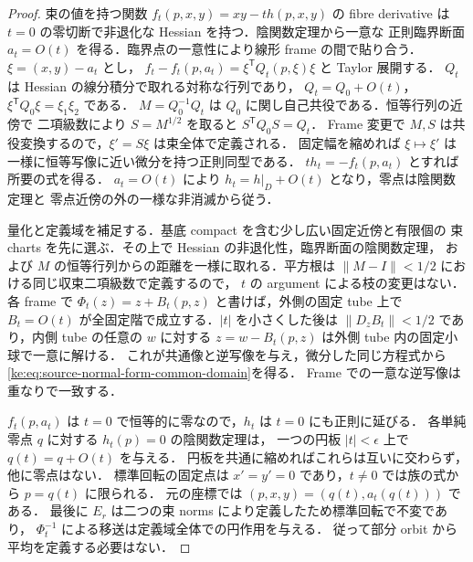 \begin{proof}
束の値を持つ関数 $f_t(p,x,y)=xy-th(p,x,y)$ の fibre derivative は
$t=0$ の零切断で非退化な Hessian を持つ．陰関数定理から一意な
正則臨界断面 $a_t=O(t)$ を得る．臨界点の一意性により線形 frame の間で貼り合う．
$\xi=(x,y)-a_t$ とし，
$f_t-f_t(p,a_t)=\xi^{\mathsf T} Q_t(p,\xi)\xi$ と Taylor 展開する．
$Q_t$ は Hessian の線分積分で取れる対称な行列であり，
$Q_t=Q_0+O(t)$，$\xi^{\mathsf T}Q_0\xi=\xi_1\xi_2$ である．
$M=Q_0^{-1}Q_t$ は $Q_0$ に関し自己共役である．恒等行列の近傍で
二項級数により $S=M^{1/2}$ を取ると $S^{\mathsf T}Q_0 S=Q_t$．
Frame 変更で $M,S$ は共役変換するので，$\xi'=S\xi$ は束全体で定義される．
固定幅を縮めれば $\xi\mapsto\xi'$ は一様に恒等写像に近い微分を持つ正則同型である．
$t h_t=-f_t(p,a_t)$ とすれば所要の式を得る．
$a_t=O(t)$ により $h_t=h|_D+O(t)$ となり，零点は陰関数定理と
零点近傍の外の一様な非消滅から従う．

量化と定義域を補足する．基底 compact を含む少し広い固定近傍と有限個の
束 charts を先に選ぶ．その上で Hessian の非退化性，臨界断面の陰関数定理，
および $M$ の恒等行列からの距離を一様に取れる．平方根は
$\|M-I\|<1/2$ における同じ収束二項級数で定義するので，
$t$ の argument による枝の変更はない．各 frame で
$\Phi_t(z)=z+B_t(p,z)$ と書けば，外側の固定 tube 上で
$B_t=O(t)$ が全固定階で成立する．$|t|$ を小さくした後は
$\|D_zB_t\|<1/2$ であり，内側 tube の任意の $w$ に対する
$z=w-B_t(p,z)$ は外側 tube 内の固定小球で一意に解ける．
これが共通像と逆写像を与え，微分した同じ方程式から
\eqref{ke:eq:source-normal-form-common-domain}を得る．
Frame での一意な逆写像は重なりで一致する．

$f_t(p,a_t)$ は $t=0$ で恒等的に零なので，$h_t$ は $t=0$ にも正則に延びる．
各単純零点 $q$ に対する $h_t(p)=0$ の陰関数定理は，
一つの円板 $|t|<\epsilon$ 上で $q(t)=q+O(t)$ を与える．
円板を共通に縮めればこれらは互いに交わらず，他に零点はない．
標準回転の固定点は $x'=y'=0$ であり，$t\ne0$ では族の式から $p=q(t)$ に限られる．
元の座標では $(p,x,y)=(q(t),a_t(q(t)))$ である．
最後に $E_r$ は二つの束 norms により定義したため標準回転で不変であり，
$\Phi_t^{-1}$ による移送は定義域全体での円作用を与える．
従って部分 orbit から平均を定義する必要はない．
\end{proof}

